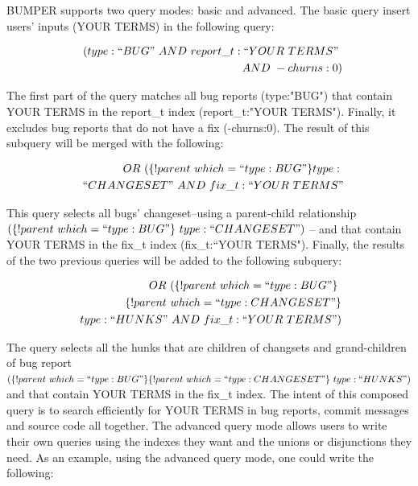 \documentclass[conference]{IEEEtran}
\begin{document}
BUMPER supports two query modes: basic and advanced.
The basic query insert users' inputs (YOUR TERMS) in the
following query:

\begin{equation*}
\begin{split}
~~(type:``BUG"~AND~report\_t:``YOUR~TERMS"~\\
~~AND~-churns:0)
\end{split}
\end{equation*}



The first part of the query matches all bug reports
(type:"BUG") that contain YOUR TERMS in the report\_t index
(report\_t:"YOUR TERMS").
Finally, it excludes bug reports that
do not have a fix (-churns:0).
The result of this subquery will be
merged with the following:

\begin{equation*}
\begin{split}
~~OR~(\{!parent~which=``type:BUG"\}type:~\\
~~``CHANGESET"~AND~fix\_t:``YOUR~TERMS"
\end{split}
\end{equation*}

This query selects all bugs' changeset--using a parent-child
relationship $(\{!parent~which=``type:BUG"\}~type:
  ``CHANGESET")$ -- and that contain YOUR TERMS in the fix\_t
  index (fix\_t:``YOUR TERMS").
Finally, the results of the two
previous queries will be added to the following subquery:

\begin{equation*}
\begin{split}
  OR~(\{!parent~which=``type:BUG"\}\ \\
~\{!parent~which=``type:CHANGESET"\}\\
~type:``HUNKS"~AND~fix\_t:``YOUR~TERMS")
\end{split}
\end{equation*}

The query selects all the hunks that are children of changsets and
grand-children of bug report $ (\{!parent~which=``type:BUG"\}
  \{!parent~which=``type:CHANGESET"\}~type:``HUNKS")$
and that
contain YOUR TERMS in the fix\_t index.
The intent of this composed query is to search efficiently for
YOUR TERMS in bug reports, commit messages and source
code all together.
The advanced query mode allows users to write their own
queries using the indexes they want and the unions or disjunctions
they need.
As an example, using the advanced query mode, one
could write the following:
\end{document}
